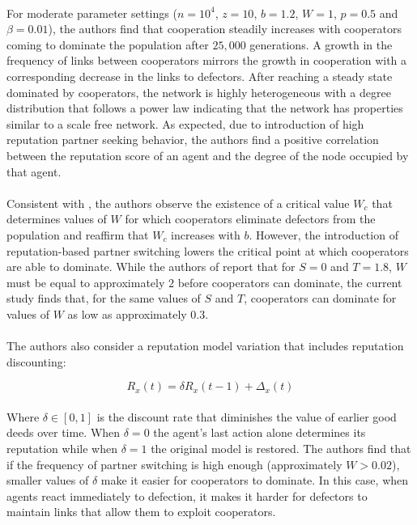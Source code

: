 \documentclass{article}
\begin{document}
	\paragraph{}For moderate parameter settings ($n=10^4$, $z=10$, $b=1.2$, $W=1$, $p=0.5$ and $\beta=0.01$), the authors find that cooperation steadily increases with cooperators coming to dominate the population after $25,000$ generations.  A growth in the frequency of links between cooperators mirrors the growth in cooperation with a corresponding decrease in the links to defectors.  After reaching a steady state dominated by cooperators, the network is highly heterogeneous with a degree distribution that follows a power law indicating that the network has properties similar to a scale free network.  As expected, due to introduction of high reputation partner seeking behavior, the authors find a positive correlation between the reputation score of an agent and the degree of the node occupied by that agent.
	\paragraph{}Consistent with \cite{Santos2006d}, the authors observe the existence of a critical value $W_c$ that determines values of $W$ for which cooperators eliminate defectors from the population and reaffirm that $W_c$ increases with $b$.  However, the introduction of reputation-based partner switching lowers the critical point at which cooperators are able to dominate. While the authors of \cite{Santos2006d} report that for $S=0$ and $T=1.8$, $W$ must be equal to approximately $2$ before cooperators can dominate, the current study finds that, for the same values of $S$ and $T$, cooperators can dominate for values of $W$ as low as approximately $0.3$.
	\paragraph{}The authors also consider a reputation model variation that includes reputation discounting:
	
	\begin{equation}
	R_x(t)=\delta R_x(t-1)+\Delta_x(t)
	\end{equation}

	\paragraph{}Where $\delta\in[0,1]$ is the discount rate that diminishes the value of earlier good deeds over time.  When $\delta=0$ the agent's last action alone determines its reputation while when $\delta=1$ the original
	\newpage
	model is restored.  The authors find that if the frequency of partner switching is high enough (approximately $W>0.02$), smaller values of $\delta$ make it easier for cooperators to dominate.  In this case, when agents react immediately to defection, it makes it harder for defectors to maintain links that allow them to exploit cooperators.
	
\end{document}
